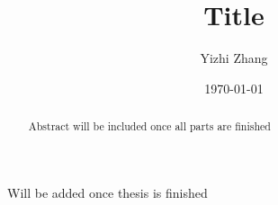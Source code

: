\documentclass[draft]{iitthesis}
\theoremstyle{definition}
\theoremstyle{remark}
\begin{document}
\title{Title}
\author{Yizhi Zhang}
\date{\today}
\copyrightnoticefalse      %
\maketitle                %


\prelimpages         %


\begin{acknowledgement}     %
\par  Will be added once thesis is finished
\end{acknowledgement}


\tableofcontents
\clearpage

\listoftables

\clearpage

\listoffigures

\clearpage


\listofsymbols

 \clearpage



\begin{abstract}           %
\par Abstract will be included once all parts are finished
\end{abstract}


\textpages     %

\end{document}
